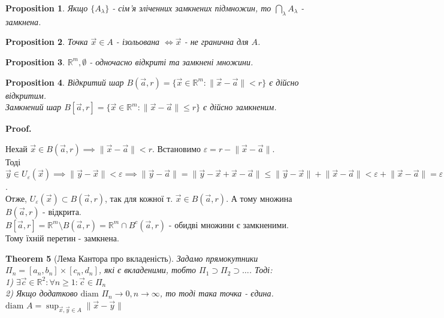 \documentclass[a4paper, 10pt]{article}
\makeatletter
\def\huge{\displaystyle}
\def\qed{$\blacksquare$}
\theoremstyle{theoremdd}
\newtheorem{theorem}{Theorem}[subsection]
\theoremstyle{theoremdd}
\theoremstyle{theoremdd}
\theoremstyle{theoremdd}
\theoremstyle{theoremdd}
\newtheorem{proposition}[theorem]{Proposition}
\theoremstyle{theoremdd}
\theoremstyle{theoremdd}
\theoremstyle{theoremdd}
\renewenvironment{proof}[1][Proof.\\]{\par
\pushQED{\hfill \qed}%
\normalfont \topsep6\p@\@plus6\p@\relax
\trivlist
\item\relax
{\bfseries
#1\@addpunct{.}}\hspace\labelsep\ignorespaces
}{%
\popQED\endtrivlist\@endpefalse
}
\makeatother
\begin{document}
\begin{proposition}
Якщо $\{A_\lambda\}$ - сім'я зліченних замкнених підмножин, то $\huge\bigcap_\lambda A_\lambda$ - замкнена.
\end{proposition}

\begin{proposition}
Точка $\vec{x} \in A$ - ізольована $\iff \vec{x}$ - не гранична для $A$.
\end{proposition}

\begin{proposition}
$\mathbb{R}^m, \emptyset$ - одночасно відкриті та замкнені множини.
\end{proposition}

\begin{proposition}
Відкритий шар $B(\vec{a},r) = \{ \vec{x} \in \mathbb{R}^m: \lVert \vec{x}-\vec{a} \rVert < r \}$ є дійсно відкритим.\\
Замкнений шар $B[\vec{a},r] = \{ \vec{x} \in \mathbb{R}^m: \lVert \vec{x}-\vec{a} \rVert \leq r \}$ є дійсно замкненим.
\end{proposition}

\begin{proof}
Нехай $\vec{x} \in B(\vec{a},r) \implies \lVert \vec{x} - \vec{a} \rVert < r$. Встановимо $\varepsilon = r - \lVert \vec{x} - \vec{a} \rVert$.\\
Тоді $\vec{y} \in U_\varepsilon(\vec{x}) \implies \lVert \vec{y} - \vec{x} \rVert < \varepsilon \implies \lVert \vec{y} - \vec{a} \rVert = \lVert \vec{y} - \vec{x} + \vec{x} - \vec{a} \rVert \leq \lVert \vec{y} - \vec{x} \rVert + \lVert \vec{x} - \vec{a} \rVert < \varepsilon + \lVert \vec{x} - \vec{a} \rVert = \varepsilon \implies \vec{y} \in B(\vec{a},r)$. \\
Отже, $U_\varepsilon (\vec{x}) \subset B(\vec{a},r)$, так для кожної т. $\vec{x} \in B(\vec{a},r)$. А тому множина $B(\vec{a},r)$ - відкрита.
\bigskip \\
$B[\vec{a}, r] = \mathbb{R}^m \setminus B(\vec{a}, r) = \mathbb{R}^m \cap B^c(\vec{a},r)$ - обидві множини є замкненими. Тому їхній перетин - замкнена.
\end{proof}

\iffalse
\begin{theorem}[Лема Кантора про вкладеність]
Задамо прямокутники $\Pi_n = [a_n,b_n] \times [c_n,d_n]$, які є вкладеними, тобто $\Pi_1 \supset \Pi_2 \supset \dots$. Тоді:\\
1) $\exists \vec{c} \in \mathbb{R}^2: \forall n \geq 1: \vec{c} \in \Pi_n$\\
2) Якщо додатково $\text{diam } \Pi_n \to 0, n \to \infty$, то тоді така точка - єдина. $\text{diam } A =\huge \sup_{\vec{x},\vec{y} \in A} \lVert \vec{x}-\vec{y} \rVert$
\end{theorem}
\end{document}
